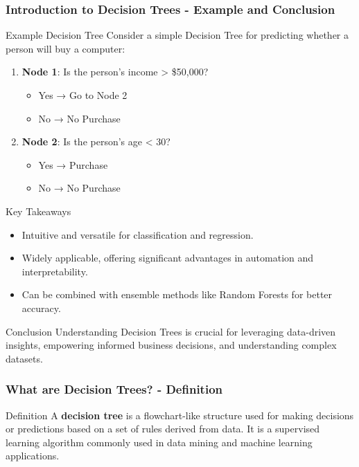 \documentclass[aspectratio=169]{beamer}
\begin{document}
\begin{frame}[fragile]
    \frametitle{Introduction to Decision Trees - Example and Conclusion}
    \begin{block}{Example Decision Tree}
        Consider a simple Decision Tree for predicting whether a person will buy a computer:
        \begin{enumerate}
            \item \textbf{Node 1}: Is the person's income > \$50,000?
                \begin{itemize}
                    \item Yes → Go to Node 2
                    \item No → No Purchase
                \end{itemize}
            \item \textbf{Node 2}: Is the person's age < 30?
                \begin{itemize}
                    \item Yes → Purchase
                    \item No → No Purchase
                \end{itemize}
        \end{enumerate}
    \end{block}

    \begin{block}{Key Takeaways}
        \begin{itemize}
            \item Intuitive and versatile for classification and regression.
            \item Widely applicable, offering significant advantages in automation and interpretability.
            \item Can be combined with ensemble methods like Random Forests for better accuracy.
        \end{itemize}
    \end{block}

    \begin{block}{Conclusion}
        Understanding Decision Trees is crucial for leveraging data-driven insights, empowering informed business decisions, and understanding complex datasets.
    \end{block}
\end{frame}

\begin{frame}[fragile]
    \frametitle{What are Decision Trees? - Definition}
    \begin{block}{Definition}
        A \textbf{decision tree} is a flowchart-like structure used for making decisions or predictions based on a set of rules derived from data. It is a supervised learning algorithm commonly used in data mining and machine learning applications.
    \end{block}
\end{frame}
\end{document}
